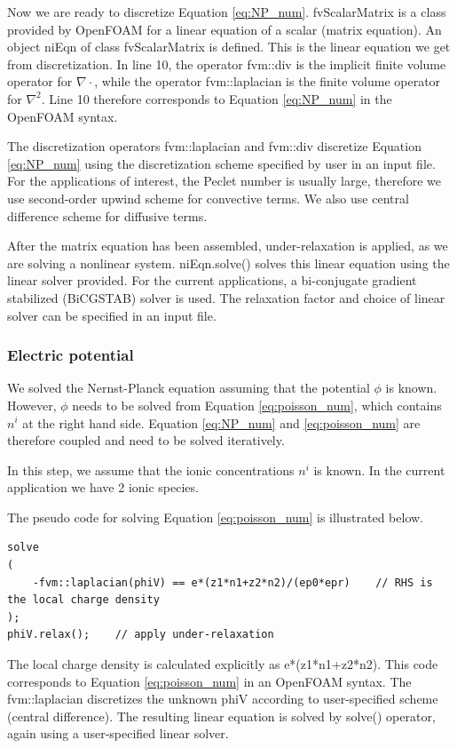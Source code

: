 Now we are ready to discretize Equation \ref{eq:NP_num}. \textsf{fvScalarMatrix} is a class provided by OpenFOAM for a linear equation of a scalar (matrix equation). An object \textsf{niEqn} of class \textsf{fvScalarMatrix} is defined. This is the linear equation we get from discretization. In line 10, the operator \textsf{fvm::div} is the implicit finite volume operator for $\nabla \cdot$, while the operator \textsf{fvm::laplacian} is the finite volume operator for $\nabla^2$. Line 10 therefore corresponds to Equation \ref{eq:NP_num} in the OpenFOAM syntax. 

The discretization operators \textsf{fvm::laplacian} and \textsf{fvm::div} discretize Equation \ref{eq:NP_num} using the discretization scheme specified by user in an input file. For the applications of interest, the Peclet number is usually large, therefore we use second-order upwind scheme for convective terms. We also use central difference scheme for diffusive terms.

After the matrix equation has been assembled, under-relaxation is applied, as we are solving a nonlinear system. \textsf{niEqn.solve()} solves this linear equation using the linear solver provided. For the current applications, a bi-conjugate gradient stabilized (BiCGSTAB) solver is used. The relaxation factor and choice of linear solver can be specified in an input file.

\subsubsection{Electric potential}
We solved the Nernst-Planck equation assuming that the potential $\phi$ is known. However, $\phi$ needs to be solved from Equation \ref{eq:poisson_num}, which contains $n^i$ at the right hand side. Equation \ref{eq:NP_num} and \ref{eq:poisson_num} are therefore coupled and need to be solved iteratively.

In this step, we assume that the ionic concentrations $n^i$ is known. In the current application we have 2 ionic species.

The pseudo code for solving Equation \ref{eq:poisson_num} is illustrated below.

\begin{lstlisting}
solve
(
    -fvm::laplacian(phiV) == e*(z1*n1+z2*n2)/(ep0*epr)    // RHS is the local charge density
);
phiV.relax();    // apply under-relaxation
\end{lstlisting}

The local charge density is calculated explicitly as \textsf{e*(z1*n1+z2*n2)}. This code corresponds to Equation \ref{eq:poisson_num} in an OpenFOAM syntax. The \textsf{fvm::laplacian} discretizes the unknown \textsf{phiV} according to user-specified scheme (central difference). The resulting linear equation is solved by \textsf{solve()} operator, again using a user-specified linear solver.

